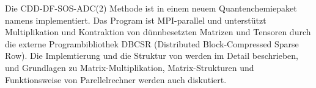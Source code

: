 Die CDD-DF-SOS-ADC(2) Methode ist in einem neuem Quantenchemiepaket namens \mchem{} implementiert.  
Das Program ist MPI-parallel und unterstützt Multiplikation und Kontraktion von dünnbesetzten Matrizen und Tensoren durch die externe Programbibliothek DBCSR (Distributed Block-Compressed Sparse Row). 
Die Implemtierung und die Struktur von \mchem{} werden im Detail beschrieben, und Grundlagen zu Matrix-Multiplikation, Matrix-Strukturen und Funktionsweise von Parellelrechner werden auch diskutiert.


\nonewpage

